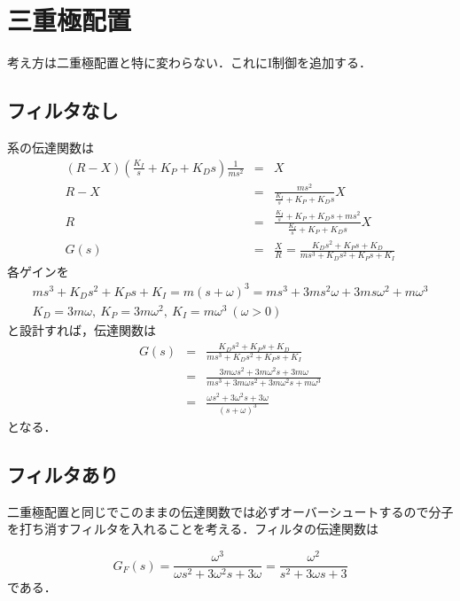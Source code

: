 \documentclass[11pt]{article} %
\begin{document}
\section{三重極配置}
考え方は二重極配置と特に変わらない．これにI制御を追加する．
\subsection{フィルタなし}
系の伝達関数は
\begin{eqnarray}
	(R-X)(\frac{K_I}{s} + K_P + K_D s) \frac{1}{ms^2} &=& X \\
	R-X &=& \frac{ms^2}{\frac{K_I}{s} + K_P + K_D s} X \\
	R &=& \frac{\frac{K_I}{s} + K_P + K_D s + ms^2}{\frac{K_I}{s} + K_P + K_D s} X \\
	G(s) &=& \frac{X}{R} = \frac{K_D s^2 + K_P s + K_D}{ms^3 + K_D s^2 + K_P s + K_I}
\end{eqnarray}
各ゲインを
\begin{eqnarray}
	ms^3 + K_D s^2 + K_P s + K_I = m(s+\omega)^3 = ms^3 + 3ms^2\omega + 3ms\omega^2 + m\omega^3 \\
   K_D = 3m\omega, \ K_P = 3m\omega^2, \ K_I = m\omega^3 \ (\omega > 0)
\end{eqnarray}
と設計すれば，伝達関数は
\begin{eqnarray}
	G(s) &=& \frac{K_D s^2 + K_P s + K_D}{ms^3 + K_D s^2 + K_P s + K_I} \\
			 &=& \frac{3m\omega s^2 + 3m\omega^2 s + 3m\omega}{ms^3 + 3m\omega s^2 + 3m\omega^2 s + m\omega^3} \\
         &=& \frac{\omega s^2 + 3\omega^2 s + 3\omega}{(s + \omega)^3}                   
\end{eqnarray}
となる．

\subsection{フィルタあり}
二重極配置と同じでこのままの伝達関数では必ずオーバーシュートするので分子を打ち消すフィルタを入れることを考える．フィルタの伝達関数は

\begin{equation}
	G_F(s) = \frac{\omega^3}{\omega s^2 + 3\omega^2 s + 3\omega} = \frac{\omega^2}{s^2 + 3\omega s + 3}
\end{equation}
である．
\end{document}
